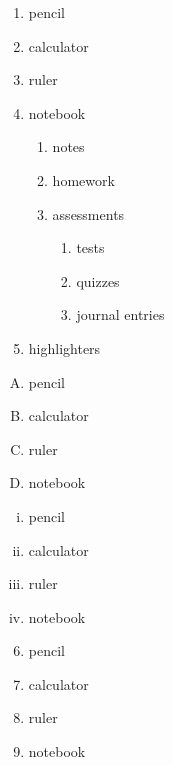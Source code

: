 \documentclass[11pt]{article}
\begin{document}
\begin{enumerate}
\item pencil
\item calculator
\item ruler
\item notebook
  \begin{enumerate}
  \item notes
  \item homework
  \item assessments
    \begin{enumerate}
    \item tests
    \item quizzes
    \item journal entries
    \end{enumerate}
  \end{enumerate}
\item highlighters
\end{enumerate}

\vspace{1cm}

\begin{enumerate}[A.]
\item pencil
\item calculator
\item ruler
\item notebook
\end{enumerate}

\vspace{1cm}

\begin{enumerate}[i.]
\item pencil
\item calculator
\item ruler
\item notebook
\end{enumerate}

\pagebreak

\begin{enumerate}\setcounter{enumi}{5}
\item pencil
\item calculator
\item ruler
\item notebook
\end{enumerate}

\vspace{1cm}
\end{document}
